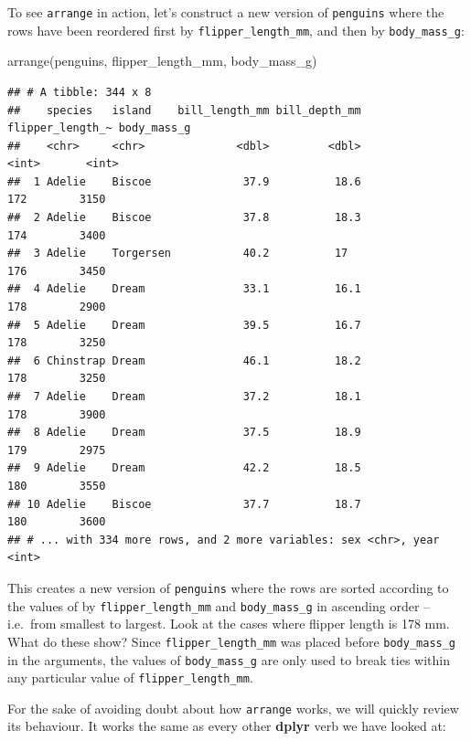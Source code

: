 \documentclass[
]{book}
\newenvironment{Shaded}{\begin{snugshade}}{\end{snugshade}}
\newcommand{\FunctionTok}[1]{\textcolor[rgb]{0.00,0.00,0.00}{#1}}
\newcommand{\NormalTok}[1]{#1}
\begin{document}
To see \texttt{arrange} in action, let's construct a new version of \texttt{penguins} where the rows have been reordered first by \texttt{flipper\_length\_mm}, and then by \texttt{body\_mass\_g}:

\begin{Shaded}
\begin{Highlighting}[]
\FunctionTok{arrange}\NormalTok{(penguins, flipper\_length\_mm, body\_mass\_g)}
\end{Highlighting}
\end{Shaded}

\begin{verbatim}
## # A tibble: 344 x 8
##    species   island    bill_length_mm bill_depth_mm flipper_length_~ body_mass_g
##    <chr>     <chr>              <dbl>         <dbl>            <int>       <int>
##  1 Adelie    Biscoe              37.9          18.6              172        3150
##  2 Adelie    Biscoe              37.8          18.3              174        3400
##  3 Adelie    Torgersen           40.2          17                176        3450
##  4 Adelie    Dream               33.1          16.1              178        2900
##  5 Adelie    Dream               39.5          16.7              178        3250
##  6 Chinstrap Dream               46.1          18.2              178        3250
##  7 Adelie    Dream               37.2          18.1              178        3900
##  8 Adelie    Dream               37.5          18.9              179        2975
##  9 Adelie    Dream               42.2          18.5              180        3550
## 10 Adelie    Biscoe              37.7          18.7              180        3600
## # ... with 334 more rows, and 2 more variables: sex <chr>, year <int>
\end{verbatim}

This creates a new version of \texttt{penguins} where the rows are sorted according to the values of by \texttt{flipper\_length\_mm} and \texttt{body\_mass\_g} in ascending order -- i.e.~from smallest to largest. Look at the cases where flipper length is 178 mm. What do these show? Since \texttt{flipper\_length\_mm} was placed before \texttt{body\_mass\_g} in the arguments, the values of \texttt{body\_mass\_g} are only used to break ties within any particular value of \texttt{flipper\_length\_mm}.

For the sake of avoiding doubt about how \texttt{arrange} works, we will quickly review its behaviour. It works the same as every other \textbf{dplyr} verb we have looked at:
\end{document}
